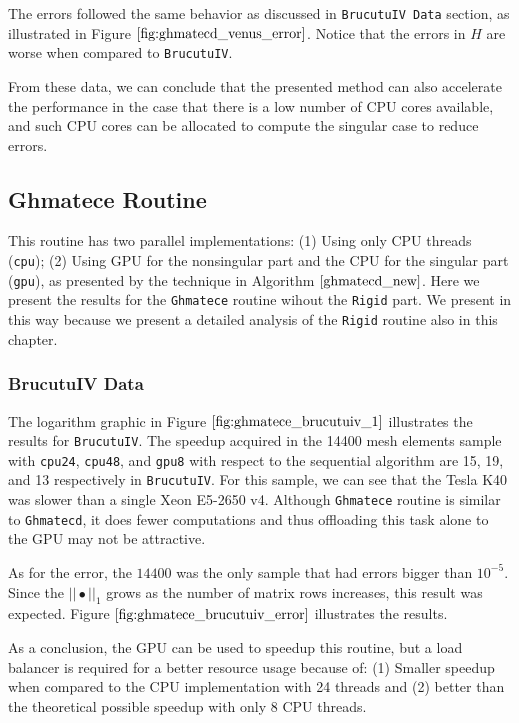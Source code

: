 The errors followed the same behavior as discussed in \texttt{BrucutuIV Data} section, as illustrated in 
Figure $\ref{fig:ghmatecd_venus_error}$. Notice that the errors in $H$ are worse when compared to
\texttt{BrucutuIV}.

From these data, we can conclude that the presented method can also accelerate the performance in 
the case that there is a low number of CPU cores available, and such CPU cores can be allocated to 
compute the singular case to reduce errors. 

\subsection{Ghmatece Routine}

This routine has two parallel implementations: (1) Using only CPU threads (\texttt{cpu}); 
(2) Using GPU for the nonsingular part and the CPU for the singular part (\texttt{gpu}), 
as presented by the technique in Algorithm $\ref{ghmatecd_new}$. Here we present the results 
for the \texttt{Ghmatece} routine wihout the \texttt{Rigid} part. We present in this way because we present 
a detailed analysis of the \texttt{Rigid} routine also in this chapter.

\subsubsection{BrucutuIV Data}

The logarithm graphic in Figure $\ref{fig:ghmatece_brucutuiv_1}$ illustrates the results 
for \texttt{BrucutuIV}. The speedup acquired in the 14400 mesh elements sample with 
\texttt{cpu24}, \texttt{cpu48}, and \texttt{gpu8} with respect to the sequential algorithm 
are 15, 19, and 13 respectively in \texttt{BrucutuIV}. For this sample, we can see that 
the Tesla K40 was slower than a single Xeon E5-2650 v4. Although \texttt{Ghmatece} 
routine is similar to \texttt{Ghmatecd}, it does fewer computations and thus offloading 
this task alone to the GPU may not be attractive.

As for the error, the $14400$ was the only sample that had errors bigger than $10^{-5}$. Since the $||\bullet||_1$
grows as the number of matrix rows increases, this result was expected. Figure $\ref{fig:ghmatece_brucutuiv_error}$
illustrates the results.

As a conclusion, the GPU can be used to speedup this routine, but a load balancer is required for a 
better resource usage because of: (1) Smaller speedup when compared to the CPU implementation with 
24 threads and (2) better than the theoretical possible speedup with only 8 CPU threads. 


